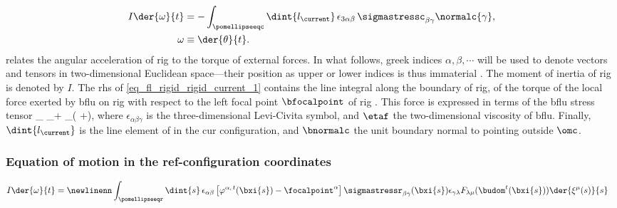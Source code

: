 \begin{align}
    \label{eq_fl_rigid_rigid_current_1}
    I         \der{\omega}{t}
           & =                                                                                             - \int_\pomellipseeqc \dint{l_\current} \, \epsilon_{3 \alpha \beta} \, \sigmastressc_{\beta \gamma} \normalc{\gamma} , \\
    \label{eq_fl_rigid_rigid_current_2}
    \omega & \equiv \der{\theta}{t}.
\end{align}
 relates the angular acceleration of \ac{rig} to the torque of external forces.
In what follows, greek indices $\alpha, \beta, \cdots$ will be used to denote vectors and tensors in  two-dimensional Euclidean space---their position as upper or lower indices is thus immaterial \cite{marchiafavaAppuntiDiGeometria2005,landauTheoryElasticity1986}.
The moment of inertia of \ac{rig} is denoted by $I$. The \ac{rhs} of \cref{eq_fl_rigid_rigid_current_1} contains the line integral along the boundary of \ac{rig}, of the torque of the local force exerted by  \ac{bflu} on  \ac{rig} with respect to the left focal point $\bfocalpoint$ of \ac{rig} \cite{landauFluidMechanics1987}. This force is expressed in terms of the \ac{bflu} stress tensor \cite{landauFluidMechanics1987}
\be
\label{eq_strees_tensor_fluid}
\sigmastressc_{\alpha \beta } \equiv \sigmafc \delta_{\alpha \beta}+ \eta_\fluid\left( \pderc{ \vfc^\alpha}{\beta} +\pderc{ \vfc^\beta}{\alpha}\right),
\ee
where $\epsilon_{\alpha \beta \gamma}$ is the three-dimensional Levi-Civita symbol, and $\etaf$ the two-dimensional viscosity of \ac{bflu}. Finally,   $\dint{l_\current}$ is the line element of \pomellipsec in the \ac{cur} configuration, and $\bnormalc$ the unit boundary normal to \pomellipsec pointing outside $\omc$.



\subsubsection{Equation of motion in the \acl{ref}-configuration coordinates}\label{sec_rigid_body_body_reference}

\bw
\begin{align}
    \label{eq_fl_rigid_rigid_reference}
    I \der{\omega}{t} & =                                               \newlinenn
    \int_\pomellipseeqr \dint{s} \, \epsilon_{\alpha \beta} \left[ \varphi^{\alpha, \, t}(\bxi{s}) - \focalpoint^\alpha \right] \sigmastressr_{\beta \gamma}(\bxi{s}) \epsilon_{\gamma \lambda} F_{\lambda \mu}(\budom^t(\bxi{s})) \der{\xi^\mu(s)}{s}
\end{align}
\ew

